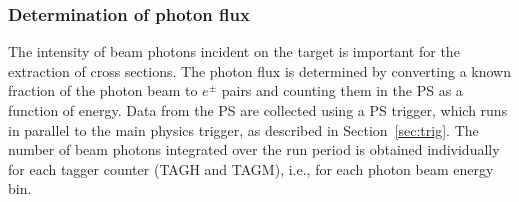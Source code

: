 %
%
%
%

\subsubsection{Determination of photon flux         \label{sec:ps_flux}}
The intensity of beam photons incident on the \GX{} target is
important for the extraction of cross sections. The photon flux
is determined by converting a known fraction of the photon beam to
$e^\pm$ pairs and counting them in the PS as     a function
of energy. Data from the PS are  collected using a PS trigger, which
runs in parallel to the  main \GX{} physics trigger, as described in
Section~\ref{sec:trig}. The number of beam photons integrated over
the run period is obtained individually for each tagger counter (TAGH
and TAGM), i.e., for each photon beam energy bin. 

